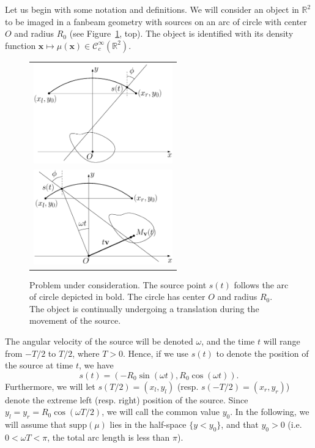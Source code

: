 \documentclass[twocolumn]{IEEEtran}
\newcommand{\R}{\mathbb{R}}
\newcommand{\ie}{i.e.}
\newcommand{\Ccinf}{\mathcal{C}_c^{\infty}}
\newcommand{\supp}{\textrm{supp}}
\begin{document}
Let us begin with some notation and definitions. We will consider an object in $\R^2$ to be imaged in a fanbeam geometry with sources on an arc of circle with center $O$ and radius $R_0$ (see Figure~\ref{fig:notations}, top). The object is identified with its density function $\mathbf{x} \mapsto \mu(\mathbf{x}) \in \Ccinf(\R^2)$.
\begin{figure}[!ht]
	\centering
	\begin{tabular}{c}
	\includegraphics[width=60mm]{figs/frame_scanner_still.eps} \\
	\includegraphics[width=60mm]{figs/frame_scanner.eps}
	\end{tabular}
	\caption{Problem under consideration. The source point $s(t)$ follows the arc of circle depicted in bold. The circle has center $O$ and radius $R_0$. The object is continually undergoing a translation during the movement of the source.\label{fig:notations}}
\end{figure}
The angular velocity of the source will be denoted $\omega$, and the time $t$ will range from $-T/2$ to $T/2$, where $T>0$. Hence, if we use $s(t)$ to denote the position of the source at time $t$, we have
\begin{equation}
	s(t) = \left( -R_0 \sin(\omega t), R_0 \cos(\omega t) \right).
\label{eq:source_position}
\end{equation}
Furthermore, we will let $s(T/2)=(x_l,y_l)$ (resp. $s(-T/2)=(x_r,y_r)$) denote the extreme left (resp. right) position of the source. Since $y_l = y_r = R_0 \cos(\omega T/2)$, we will call the common value $y_0$. In the following, we will assume that $\supp(\mu)$ lies in the half-space $\{ y < y_0 \}$, and that $y_0 > 0$ (\ie $0 < \omega T < \pi$, the total arc length is less than $\pi$).
\end{document}
